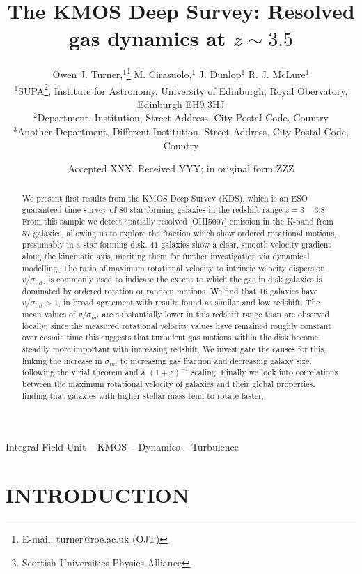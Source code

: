 \documentclass[a4paper,fleqn,usenatbib]{mn2e}
\title[Spatially resolved dynamics at $z \sim 3.5$]{The KMOS Deep Survey: Resolved gas dynamics at $z \sim 3.5$}
\author[O.J. Turner et al.]{
Owen J. Turner,$^{1}$\thanks{E-mail: turner@roe.ac.uk (OJT)}
M. Cirasuolo,$^{1}$
J. Dunlop$^{1}$
R. J. McLure$^{1}$
\\
$^{1}$SUPA\thanks{Scottish Universities Physics Alliance}, Institute for Astronomy, University of Edinburgh, Royal Obervatory, Edinburgh EH9 3HJ\\
$^{2}$Department, Institution, Street Address, City Postal Code, Country\\
$^{3}$Another Department, Different Institution, Street Address, City Postal Code, Country
}
\date{Accepted XXX. Received YYY; in original form ZZZ}
\begin{document}
\label{firstpage}
\pagerange{\pageref{firstpage}--\pageref{lastpage}}
\maketitle

\begin{abstract}
We present first results from the KMOS Deep Survey (KDS), which is an ESO guaranteed time survey of 80 star-forming galaxies in the redshift range $z = 3 - 3.8$.
From this sample we detect spatially resolved [OIII5007] emission in the K-band from 57 galaxies, allowing us to explore the fraction which show ordered rotational motions, presumably in a star-forming disk.
41 galaxies show a clear, smooth velocity gradient along the kinematic axis, meriting them for further investigation via dynamical modelling.
The ratio of maximum rotational velocity to intrinsic velocity dispersion, $v / \sigma _{int}$, is commonly used to indicate the extent to which the gas in disk galaxies is dominated by ordered rotation or random motions.
We find that 16 galaxies have $v / \sigma _{int} > 1$, in broad agreement with results found at similar and low redshift.
The mean values of $v / \sigma _{int}$ are substantially lower in this redshift range than are observed locally; since the measured rotational velocity values have remained roughly constant over cosmic time this suggests that turbulent gas motions within the disk become steadily more important with increasing redshift.
We investigate the causes for this, linking the increase in $\sigma _{int}$ to increasing gas fraction and decreasing galaxy size, following the virial theorem and a $(1 + z)^{-1}$ scaling.
Finally we look into correlations between the maximum rotational velocity of galaxies and their global properties, finding that galaxies with higher stellar mass tend to rotate faster.




\end{abstract}

\begin{keywords}
Integral Field Unit -- KMOS -- Dynamics -- Turbulence
\end{keywords}



\section{INTRODUCTION}
\end{document}
